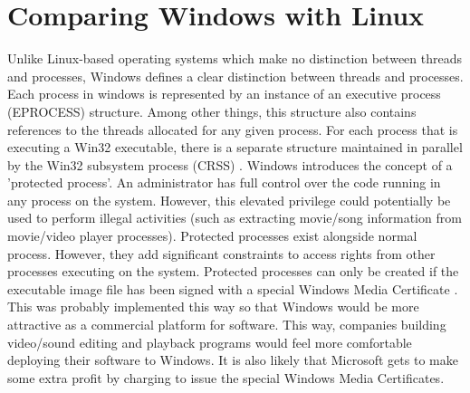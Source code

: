 \documentclass[onecolumn,10pt]{IEEETran}
\begin{document}
\section{Comparing Windows with Linux}
Unlike Linux-based operating systems which make no distinction between threads and processes, Windows defines a clear distinction between threads and processes.  Each process in windows is represented by an instance of an executive process (EPROCESS) structure.  Among other things, this structure also contains references to the threads allocated for any given process.  For each process that is executing a Win32 executable, there is a separate structure maintained in parallel by the Win32 subsystem process (CRSS) \cite{windows}.
	Windows introduces the concept of a 'protected process'.  An administrator has full control over the code running in any process on the system.  However, this elevated privilege could potentially be used to perform illegal activities (such as extracting movie/song information from movie/video player processes).  Protected processes exist alongside normal process.  However, they add significant constraints to access rights from other processes executing on the system.  Protected processes can only be created if the executable image file has been signed with a special Windows Media Certificate \cite{windows}.  This was probably implemented this way so that Windows would be more attractive as a commercial platform for software.  This way, companies building video/sound editing and playback programs would feel more comfortable deploying their software to Windows.  It is also likely that Microsoft gets to make some extra profit by charging to issue the special Windows Media Certificates.



\newpage
\end{document}

